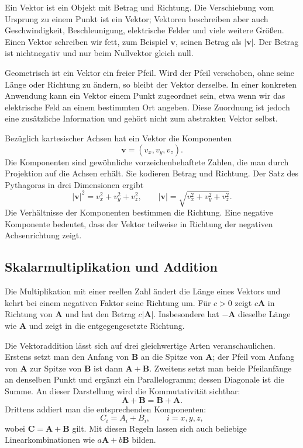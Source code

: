 Ein Vektor ist ein Objekt mit Betrag und Richtung. Die Verschiebung vom Ursprung zu einem Punkt ist ein Vektor; Vektoren beschreiben aber auch Geschwindigkeit, Beschleunigung, elektrische Felder und viele weitere Größen. Einen Vektor schreiben wir fett, zum Beispiel \(\mathbf v\), seinen Betrag als \(\lvert\mathbf v\rvert\). Der Betrag ist nichtnegativ und nur beim Nullvektor gleich null.

Geometrisch ist ein Vektor ein freier Pfeil. Wird der Pfeil verschoben, ohne seine Länge oder Richtung zu ändern, so bleibt der Vektor derselbe. In einer konkreten Anwendung kann ein Vektor einem Punkt zugeordnet sein, etwa wenn wir das elektrische Feld an einem bestimmten Ort angeben. Diese Zuordnung ist jedoch eine zusätzliche Information und gehört nicht zum abstrakten Vektor selbst.

Bezüglich kartesischer Achsen hat ein Vektor die Komponenten \begin{equation}
  \mathbf v=(v_x,v_y,v_z).
\end{equation}Die Komponenten sind gewöhnliche vorzeichenbehaftete Zahlen, die man durch Projektion auf die Achsen erhält. Sie kodieren Betrag und Richtung. Der Satz des Pythagoras in drei Dimensionen ergibt \begin{equation}
  \lvert\mathbf v\rvert^2
  =v_x^2+v_y^2+v_z^2,
  \qquad
  \lvert\mathbf v\rvert
  =\sqrt{v_x^2+v_y^2+v_z^2}.
  \label{eq:vector-magnitude}
\end{equation}Die Verhältnisse der Komponenten bestimmen die Richtung. Eine negative Komponente bedeutet, dass der Vektor teilweise in Richtung der negativen Achsenrichtung zeigt.

\subsection{Skalarmultiplikation und Addition}

Die Multiplikation mit einer reellen Zahl ändert die Länge eines Vektors und kehrt bei einem negativen Faktor seine Richtung um. Für \(c>0\) zeigt \(c\mathbf A\) in Richtung von \(\mathbf A\) und hat den Betrag \(c\lvert\mathbf A\rvert\). Insbesondere hat \(-\mathbf A\) dieselbe Länge wie \(\mathbf A\) und zeigt in die entgegengesetzte Richtung.

Die Vektoraddition lässt sich auf drei gleichwertige Arten veranschaulichen. Erstens setzt man den Anfang von \(\mathbf B\) an die Spitze von \(\mathbf A\); der Pfeil vom Anfang von \(\mathbf A\) zur Spitze von \(\mathbf B\) ist dann \(\mathbf A+\mathbf B\). Zweitens setzt man beide Pfeilanfänge an denselben Punkt und ergänzt ein Parallelogramm; dessen Diagonale ist die Summe. An dieser Darstellung wird die Kommutativität sichtbar: \begin{equation}
  \mathbf A+\mathbf B=\mathbf B+\mathbf A.
\end{equation}Drittens addiert man die entsprechenden Komponenten: \begin{equation}
  C_i=A_i+B_i,
  \qquad i=x,y,z,
  \label{eq:component-addition}
\end{equation}wobei \(\mathbf C=\mathbf A+\mathbf B\) gilt. Mit diesen Regeln lassen sich auch beliebige Linearkombinationen wie \(a\mathbf A+b\mathbf B\) bilden.

